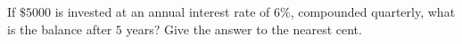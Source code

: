 If $\$5000$ is invested at an annual interest rate of $6\%$, compounded quarterly, what is the balance after $5$ years? Give the answer to the nearest cent.
